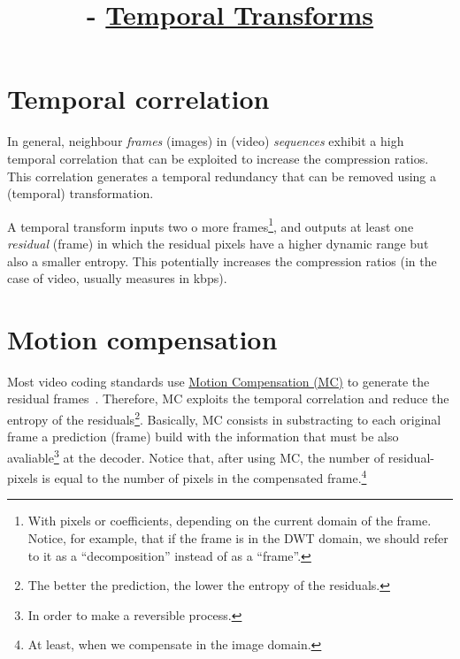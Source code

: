 


\title{\SM{} - \href{https://github.com/Sistemas-Multimedia/Sistemas-Multimedia.github.io/tree/master/contents/temporal_transforms}{Temporal Transforms}}

\maketitle
\tableofcontents

\section{Temporal correlation}

In general, neighbour \emph{frames} (images) in (video)
\emph{sequences} exhibit a high temporal correlation that can be
exploited to increase the compression ratios. This correlation
generates a temporal redundancy that can be removed using a (temporal)
transformation.

A temporal transform inputs two o more frames\footnote{With pixels or
  coefficients, depending on the current domain of the frame. Notice,
  for example, that if the frame is in the DWT domain, we should refer
  to it as a ``decomposition'' instead of as a ``frame''.}, and
outputs at least one \emph{residual} (frame) in which the residual
pixels have a higher dynamic range but also a smaller entropy. This
potentially increases the compression ratios (in the case of video,
usually measures in kbps).


\section{Motion compensation}

Most video coding standards use
\href{https://en.wikipedia.org/wiki/Motion_compensation}{Motion
  Compensation (MC)} to generate the residual
frames~\cite{vruiz__MC}. Therefore, MC exploits the temporal
correlation and reduce the entropy of the residuals\footnote{The
  better the prediction, the lower the entropy of the
  residuals.}. Basically, MC consists in substracting to each original
frame a prediction (frame) build with the information that must be
also avaliable\footnote{In order to make a reversible process.} at the
decoder. Notice that, after using MC, the number of residual-pixels is
equal to the number of pixels in the compensated frame.\footnote{At
  least, when we compensate in the image domain.}

